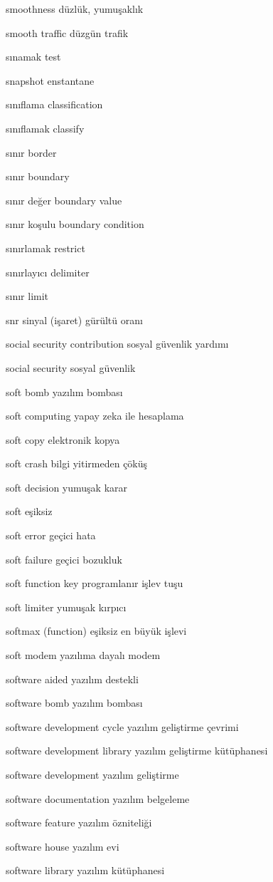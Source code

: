 \documentclass[12pt,fleqn]{article}\usepackage{../../common}
\begin{document}
smoothness düzlük, yumuşaklık

smooth traffic düzgün trafik

sınamak test

snapshot enstantane

sınıflama classification

sınıflamak classify

sınır border

sınır boundary

sınır değer boundary value

sınır koşulu boundary condition

sınırlamak restrict

sınırlayıcı delimiter

sınır limit

snr sinyal (işaret) gürültü oranı

social security contribution sosyal güvenlik yardımı

social security sosyal güvenlik

soft bomb yazılım bombası

soft computing yapay zeka ile hesaplama

soft copy elektronik kopya

soft crash bilgi yitirmeden çöküş

soft decision yumuşak karar

soft eşiksiz

soft error geçici hata

soft failure geçici bozukluk

soft function key programlanır işlev tuşu

soft limiter yumuşak kırpıcı

softmax (function) eşiksiz en büyük işlevi

soft modem yazılıma dayalı modem

software aided yazılım destekli

software bomb yazılım bombası

software development cycle yazılım geliştirme çevrimi

software development library yazılım geliştirme kütüphanesi

software development yazılım geliştirme

software documentation yazılım belgeleme

software feature yazılım özniteliği

software house yazılım evi

software library yazılım kütüphanesi
\end{document}
